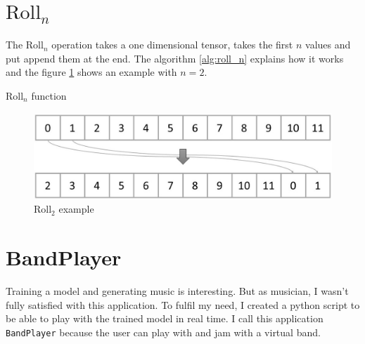 \documentclass[12pt]{report}
\begin{document}
\section{$\text{Roll}_n$}
\label{appendix:roll_n}

The $\text{Roll}_n$ operation takes a one dimensional tensor, takes the first $n$ values and put append them at the end.
The algorithm \ref{alg:roll_n} explains how it works and the figure \ref{fig:roll_2} shows an example with $n=2$.

\begin{algorithm}
    \begin{algorithmic}[1]
        \Statex
            \EndFor
            \State {}
        \EndFunction
        \end{algorithmic}
    \caption{$\text{Roll}_n$ function}
    \label{alg:roll_n}
\end{algorithm}

\begin{figure}[ht]
    \centering
    \includegraphics[width=\textwidth]{images/nn/tensor/roll_2.jpg}
    \caption{$\text{Roll}_2$ example}
    \label{fig:roll_2}
\end{figure}

\section{BandPlayer}

Training a model and generating music is interesting.
But as musician, I wasn't fully satisfied with this application.
To fulfil my need, I created a python script to be able to play with the trained model in real time.
I call this application \texttt{BandPlayer} because the user can play with and jam with a virtual band.
\end{document}
